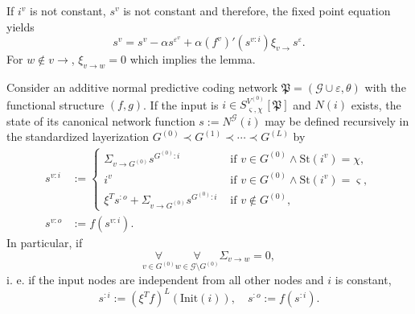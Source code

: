 \documentclass[a4paper,11pt]{report}
\newcommand{\const}{\varsigma} %
\newcommand{\var}{\chi} %
\newcommand{\In}{\text{Init}}
\newcommand{\St}{\text{St}}
\begin{document}
\begin{Bew}
If $i^v$ is not constant, $s^v$ is not constant and therefore, the fixed point equation yields
\[
s^v=s^v-\alpha s^{\varepsilon^v}+\alpha\left(f^v\right)'(s^{v:i})\xi_{v\to}s^{\varepsilon}.
\]
For $w\notin v\to$, $\xi_{v\to w}=0$ which implies the lemma.
\end{Bew}

\begin{Lem}\label{lem:predicode-predistate}
Consider an additive normal predictive coding network $\mathfrak{P}=(\mathcal{G}\cup\varepsilon,\theta)$ with the functional structure $(f,g)$. If the input is $i\in S^{V^{(0)}}_{\const,\var}[\mathfrak{P}]$ and $N(i)$ exists, the state of its canonical network function $s:=N^{\mathcal{G}}(i)$ may be defined recursively in the standardized layerization $G^{(0)}\prec G^{(1)}\prec\dotsb\prec G^{(L)}$ by
\begin{equation}\label{eq:predicode-predistate}
\begin{aligned}
s^{v:i}&:=
\begin{cases}
\Sigma_{v\to G^{(0)}}s^{G^{(0)}:i}&\text{ if }v\in G^{(0)}\wedge\St(i^v)=\var,\\
i^v&\text{ if }v\in G^{(0)}\wedge\St(i^v)=\const,\\
\xi^Ts^{:o}+\Sigma_{v\to G^{(0)}}s^{G^{(0)}:i}&\text{ if }v\notin G^{(0)},
\end{cases}
\\
s^{v:o}&:=f(s^{v:i}).
\end{aligned}
\end{equation}
In particular, if
\[
\underset{v\in G^{(0)}}{\forall}\underset{w\in \mathcal{G}\setminus G^{(0)}}{\forall}\Sigma_{v\to w}=0,
\]
i. e. if the input nodes are independent from all other nodes and $i$ is constant, 
\begin{equation}
s^{:i}:=\left(\xi^Tf\right)^{L}\left(\In(i)\right),
\quad
s^{:o}:=f(s^{:i}).
\end{equation}
\end{Lem}
\end{document}
